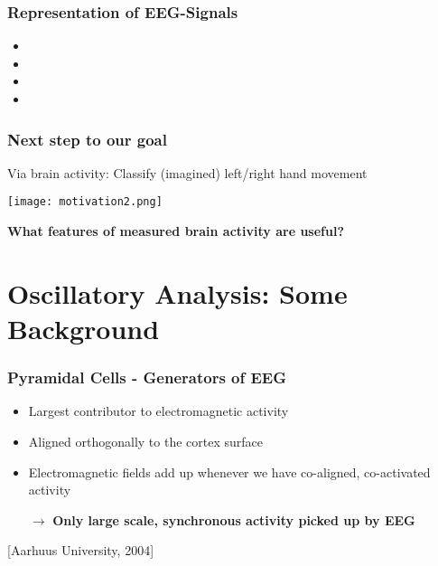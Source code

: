 \documentclass{beamer}
\begin{document}
\begin{frame}
	\frametitle{Representation of EEG-Signals}
	\centering
	\begin{itemize}
	\item {}
	\item {}
	\item {}
	\item {}
	\end{itemize}
\end{frame}

\begin{frame}
\frametitle{Next step to our goal}
	Via brain activity: Classify (imagined) left/right hand movement
	\begin{center}
	
	\texttt{[image: motivation2.png]}
	\end{center}
	{\bf What features of measured brain activity are useful?}
\end{frame}


\section{Oscillatory Analysis: Some Background }

\begin{frame}
\frametitle{Pyramidal Cells - Generators of EEG}
	\begin{itemize}
	\item Largest contributor to electromagnetic activity
	\item Aligned orthogonally to the cortex surface
	\item Electromagnetic fields add up whenever we have co-aligned, co-activated activity
	\item[$\rightarrow$] {\bf Only large scale, synchronous activity picked up by EEG}
	\end{itemize}
	\centering
	{\tiny [Aarhuus University, 2004]}
\end{frame}
\end{document}
